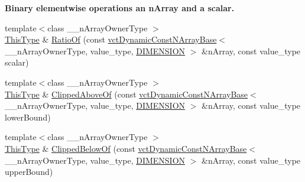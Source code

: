 \begin{Indent}{\bf Binary elementwise operations an n\-Array and a scalar.}
\begin{DoxyCompactItemize}
\item 
{\footnotesize template$<$class \-\_\-\-\_\-n\-Array\-Owner\-Type $>$ }\\\hyperlink{classvct_dynamic_const_n_array_base_a5123caffcf1455a1b99003877eade897}{This\-Type} \& \hyperlink{classvct_dynamic_n_array_base_a7476af6329eb35272605fbe6c8b6dd2d}{Ratio\-Of} (const \hyperlink{classvct_dynamic_const_n_array_base}{vct\-Dynamic\-Const\-N\-Array\-Base}$<$ \-\_\-\-\_\-n\-Array\-Owner\-Type, value\-\_\-type, \hyperlink{classvct_dynamic_n_array_base_aa66532d28588bdf26d08fb593db815d6abfcde386ec801b212d7c42d63a4f3837}{D\-I\-M\-E\-N\-S\-I\-O\-N} $>$ \&n\-Array, const value\-\_\-type scalar)
\item 
{\footnotesize template$<$class \-\_\-\-\_\-n\-Array\-Owner\-Type $>$ }\\\hyperlink{classvct_dynamic_const_n_array_base_a5123caffcf1455a1b99003877eade897}{This\-Type} \& \hyperlink{classvct_dynamic_n_array_base_a0426afa76b231d9774198cbca3cb1c1c}{Clipped\-Above\-Of} (const \hyperlink{classvct_dynamic_const_n_array_base}{vct\-Dynamic\-Const\-N\-Array\-Base}$<$ \-\_\-\-\_\-n\-Array\-Owner\-Type, value\-\_\-type, \hyperlink{classvct_dynamic_n_array_base_aa66532d28588bdf26d08fb593db815d6abfcde386ec801b212d7c42d63a4f3837}{D\-I\-M\-E\-N\-S\-I\-O\-N} $>$ \&n\-Array, const value\-\_\-type lower\-Bound)
\item 
{\footnotesize template$<$class \-\_\-\-\_\-n\-Array\-Owner\-Type $>$ }\\\hyperlink{classvct_dynamic_const_n_array_base_a5123caffcf1455a1b99003877eade897}{This\-Type} \& \hyperlink{classvct_dynamic_n_array_base_a94a4b746a3263b7ad1539f94f50ab0c9}{Clipped\-Below\-Of} (const \hyperlink{classvct_dynamic_const_n_array_base}{vct\-Dynamic\-Const\-N\-Array\-Base}$<$ \-\_\-\-\_\-n\-Array\-Owner\-Type, value\-\_\-type, \hyperlink{classvct_dynamic_n_array_base_aa66532d28588bdf26d08fb593db815d6abfcde386ec801b212d7c42d63a4f3837}{D\-I\-M\-E\-N\-S\-I\-O\-N} $>$ \&n\-Array, const value\-\_\-type upper\-Bound)
\end{DoxyCompactItemize}
\end{Indent}

